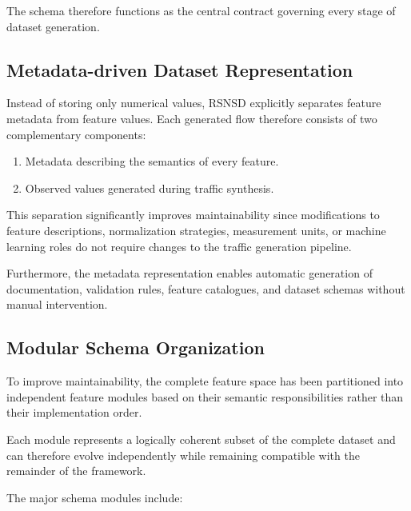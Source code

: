 \documentclass[12pt,a4paper]{article}
\begin{document}
The schema therefore functions as the central contract governing every stage of dataset generation.

\subsection{Metadata-driven Dataset Representation}

Instead of storing only numerical values, RSNSD explicitly separates feature metadata from feature values. Each generated flow therefore consists of two complementary components:

\begin{enumerate}
	
	\item Metadata describing the semantics of every feature.
	
	\item Observed values generated during traffic synthesis.
	
\end{enumerate}

This separation significantly improves maintainability since modifications to feature descriptions, normalization strategies, measurement units, or machine learning roles do not require changes to the traffic generation pipeline.

Furthermore, the metadata representation enables automatic generation of documentation, validation rules, feature catalogues, and dataset schemas without manual intervention.

\subsection{Modular Schema Organization}

To improve maintainability, the complete feature space has been partitioned into independent feature modules based on their semantic responsibilities rather than their implementation order.

Each module represents a logically coherent subset of the complete dataset and can therefore evolve independently while remaining compatible with the remainder of the framework.

The major schema modules include:
\end{document}

